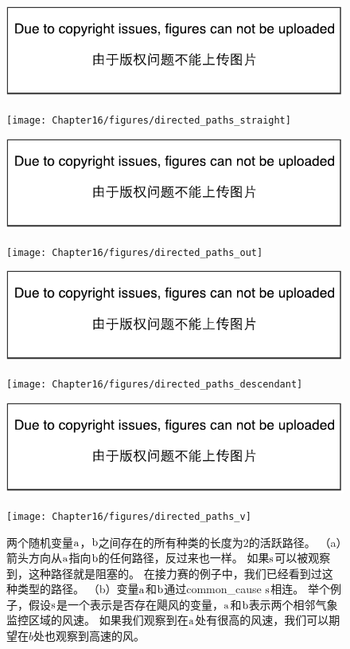 \begin{figure}[!htb]
	\ifOpenSource
	\centerline{\includegraphics{figure.pdf}}
	\else
	\centerline{\texttt{[image: Chapter16/figures/directed\_paths\_straight]}}	
	\fi
	\ifOpenSource
	\centerline{\includegraphics{figure.pdf}}
	\else
	\centerline{\texttt{[image: Chapter16/figures/directed\_paths\_out]}}
	\fi
	\ifOpenSource
	\centerline{\includegraphics{figure.pdf}}
	\else
	\centerline{\texttt{[image: Chapter16/figures/directed\_paths\_descendant]}}
	\fi
	\ifOpenSource
	\centerline{\includegraphics{figure.pdf}}
	\else
	\centerline{\texttt{[image: Chapter16/figures/directed\_paths\_v]}}		
	\fi
\caption{两个随机变量$\mathrm{a}$，$\mathrm{b}$之间存在的所有种类的长度为$2$的活跃路径。
（a）箭头方向从$\mathrm{a}$指向$\mathrm{b}$的任何路径，反过来也一样。
如果$\mathrm{s}$可以被观察到，这种路径就是阻塞的。
在接力赛的例子中，我们已经看到过这种类型的路径。
（b）变量$\mathrm{a}$和$\mathrm{b}$通过\gls{common_cause} $\mathrm{s}$相连。
举个例子，假设$\mathrm{s}$是一个表示是否存在飓风的变量，$\mathrm{a}$和$\mathrm{b}$表示两个相邻气象监控区域的风速。
如果我们观察到在$\mathrm{a}$处有很高的风速，我们可以期望在$b$处也观察到高速的风。
}
\end{figure}
